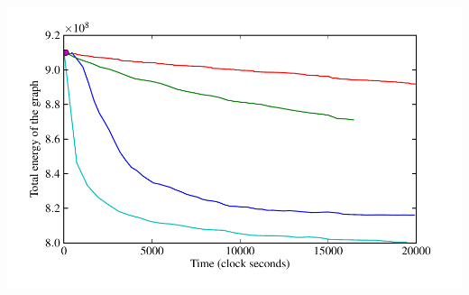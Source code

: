 \documentclass{beamer}
\begin{document}
\begin{frame}
  \includegraphics[width=\mysubfloatwidth]{../Data/albertb.sm/plot-time-energy.pdf}%
\end{frame}
\end{document}
